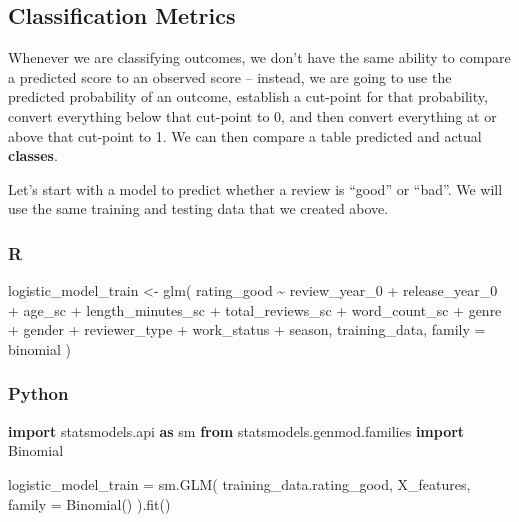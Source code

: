 \documentclass[
  letterpaper,
]{krantz}
\newenvironment{Shaded}{}{}
\newcommand{\AttributeTok}[1]{\textcolor[rgb]{0.49,0.56,0.16}{#1}}
\newcommand{\FunctionTok}[1]{\textcolor[rgb]{0.02,0.16,0.49}{#1}}
\newcommand{\ImportTok}[1]{\textcolor[rgb]{0.00,0.50,0.00}{\textbf{#1}}}
\newcommand{\NormalTok}[1]{#1}
\newcommand{\OperatorTok}[1]{\textcolor[rgb]{0.40,0.40,0.40}{#1}}
\newcommand{\OtherTok}[1]{\textcolor[rgb]{0.00,0.44,0.13}{#1}}
\newcommand{\SpecialCharTok}[1]{\textcolor[rgb]{0.25,0.44,0.63}{#1}}
\begin{document}
\subsection{Classification Metrics}\label{classification-metrics}

Whenever we are classifying outcomes, we don't have the same ability to
compare a predicted score to an observed score -- instead, we are going
to use the predicted probability of an outcome, establish a cut-point
for that probability, convert everything below that cut-point to 0, and
then convert everything at or above that cut-point to 1. We can then
compare a table predicted and actual \textbf{classes}.

Let's start with a model to predict whether a review is ``good'' or
``bad''. We will use the same training and testing data that we created
above.

\subsubsection{R}

\begin{Shaded}
\begin{Highlighting}[]
\NormalTok{logistic\_model\_train }\OtherTok{\textless{}{-}} \FunctionTok{glm}\NormalTok{(}
\NormalTok{  rating\_good }\SpecialCharTok{\textasciitilde{}} 
\NormalTok{    review\_year\_0 }\SpecialCharTok{+}\NormalTok{ release\_year\_0 }\SpecialCharTok{+} 
\NormalTok{    age\_sc }\SpecialCharTok{+}\NormalTok{ length\_minutes\_sc }\SpecialCharTok{+} 
\NormalTok{    total\_reviews\_sc }\SpecialCharTok{+}\NormalTok{ word\_count\_sc }\SpecialCharTok{+}
\NormalTok{    genre }\SpecialCharTok{+}\NormalTok{ gender }\SpecialCharTok{+}
\NormalTok{    reviewer\_type }\SpecialCharTok{+}\NormalTok{ work\_status }\SpecialCharTok{+}
\NormalTok{    season, }
\NormalTok{  training\_data, }
  \AttributeTok{family =}\NormalTok{ binomial}
\NormalTok{)}
\end{Highlighting}
\end{Shaded}

\subsubsection{Python}

\begin{Shaded}
\begin{Highlighting}[]
\ImportTok{import}\NormalTok{ statsmodels.api }\ImportTok{as}\NormalTok{ sm}
\ImportTok{from}\NormalTok{ statsmodels.genmod.families }\ImportTok{import}\NormalTok{ Binomial}

\NormalTok{logistic\_model\_train }\OperatorTok{=}\NormalTok{ sm.GLM(}
\NormalTok{    training\_data.rating\_good,}
\NormalTok{    X\_features,}
\NormalTok{    family }\OperatorTok{=}\NormalTok{ Binomial()}
\NormalTok{).fit()}
\end{Highlighting}
\end{Shaded}
\end{document}

